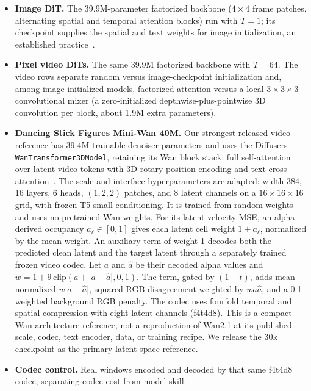 \documentclass[10pt,twocolumn,letterpaper]{article}
\begin{document}
\begin{itemize}[leftmargin=*,nosep]
\item \textbf{Image DiT.} The 39.9M-parameter factorized backbone ($4\times4$ frame patches, alternating
spatial and temporal attention blocks) run with $T{=}1$; its checkpoint supplies the spatial and text
weights for image initialization, an established practice~\cite{ho2022vdm,singer2023makeavideo}.
\item \textbf{Pixel video DiTs.} The same 39.9M factorized backbone with $T{=}64$. The video rows separate
random versus image-checkpoint initialization and, among image-initialized models, factorized attention versus a
local $3{\times}3{\times}3$ convolutional mixer (a zero-initialized depthwise-plus-pointwise 3D convolution
per block, about 1.9M extra parameters).
\item \textbf{Dancing Stick Figures Mini-Wan 40M.} Our strongest released video reference has 39.4M
trainable denoiser parameters and uses the Diffusers \texttt{WanTransformer3DModel}, retaining its Wan block
stack: full self-attention over latent video tokens with 3D rotary position encoding and text
cross-attention~\cite{wan2025}. The scale and interface
hyperparameters are adapted: width 384, 16 layers, 6 heads, $(1,2,2)$ patches, and 8 latent channels on a
$16\times16\times16$ grid, with frozen T5-small conditioning. It is trained from random weights and uses no
pretrained Wan weights. For its latent velocity MSE, an alpha-derived occupancy $a_\ell\in[0,1]$ gives each
latent cell weight $1+a_\ell$, normalized by the mean weight. An auxiliary term of weight 1 decodes both
the predicted clean latent and the target latent through a separately trained frozen video codec. Let
$a$ and $\hat a$ be their decoded alpha values and $w=1+9\,\mathrm{clip}(a+|a-\hat a|,0,1)$. The term,
gated by $(1-t)$, adds mean-normalized $w|a-\hat a|$, squared RGB disagreement weighted by
$wa\hat a$, and a 0.1-weighted background RGB penalty. The codec uses fourfold temporal and spatial
compression with eight latent channels (f4t4d8). This is a compact Wan-architecture reference, not a
reproduction of Wan2.1 at its published scale, codec, text encoder, data, or training recipe. We release the
30k checkpoint as the primary latent-space reference.
\item \textbf{Codec control.} Real windows encoded and decoded by that same f4t4d8 codec, separating codec
cost from model skill.
\end{itemize}
\end{document}
